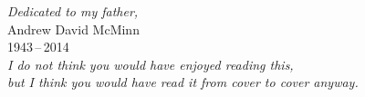 
\thispagestyle{empty}

\vspace*{3cm}

\begin{center}
\emph{\small Dedicated to my father,} \\Andrew David McMinn \\
\small 1943\,--\,2014\\
\smallskip
\bigskip
\emph{\small I do not think you would have enjoyed reading this,\\
but I think you would have read it from cover to cover anyway.} \\
\end{center}